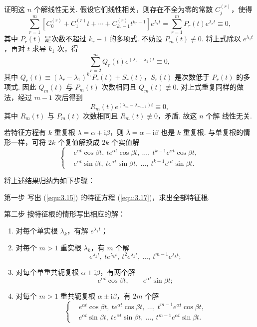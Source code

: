 \begin{pf1}
证明这 $n$ 个解线性无关. 假设它们线性相关，则存在不全为零的常数
$C_j^{(r)}$，使得
\[
\sum_{r=1}^m\left[C_0^{(r)}+C_1^{(r)}t+\cdots
+C_{k_r-1}^{(r)}t^{k_r-1}\right]e^{\lambda_rt}
=\sum_{r=1}^mP_r(t)e^{\lambda_rt}\equiv0,
\]
其中 $P_r(t)$ 是次数不超过 $k_r-1$ 的多项式. 不妨设
$P_m(t)\not\equiv0$. 将上式除以 $e^{\lambda_1t}$，再对 $t$ 求导 $k_1$ 次，得
\[
\sum_{r=2}^mQ_r(t)e^{(\lambda_r-\lambda_1)t}\equiv0,
\]
其中 $Q_r(t)\equiv(\lambda_r-\lambda_1)^{k_1}P_r(t)+S_r(t)$，$S_r(t)$ 是次数低于
$P_r(t)$ 的多项式. 因此 $Q_m(t)$ 与 $P_m(t)$ 次数相同且 $Q_m(t)\not\equiv0$.
对上式重复同样的做法，经过 $m-1$ 次后得到
\[
R_m(t)e^{(\lambda_m-\lambda_{m-1})t}\equiv0,
\]
其中 $R_m(t)$ 与 $P_m(t)$ 次数相同且 $R_m(t)\not\equiv0$，矛盾. 故这 $n$ 个解
线性无关.
\end{pf1}

若特征方程有 $k$ 重复根 $\lambda=\alpha+\mathrm{i}\beta$，则
$\bar\lambda=\alpha-\mathrm{i}\beta$ 也是 $k$ 重复根. 与单复根的情形一样，可将
$2k$ 个复值解换成 $2k$ 个实值解
\[
\left\{
\begin{aligned}
&e^{\alpha t}\cos\beta t,\ te^{\alpha t}\cos\beta t,\ \dots,\
t^{k-1}e^{\alpha t}\cos\beta t,\\
&e^{\alpha t}\sin\beta t,\ te^{\alpha t}\sin\beta t,\ \dots,\
t^{k-1}e^{\alpha t}\sin\beta t.
\end{aligned}
\right.
\]

将上述结果归纳为如下步骤：

第一步 写出 (\ref{equ:3.15}) 的特征方程 (\ref{equ:3.17})，求出全部特征根.

第二步 按特征根的情形写出相应的解：
\begin{enumerate}
\item 对每个单实根 $\lambda_k$，有解 $e^{\lambda_kt}$；
\item 对每个 $m>1$ 重实根 $\lambda_k$，有 $m$ 个解
\[
e^{\lambda_kt},\ te^{\lambda_kt},\ t^2e^{\lambda_kt},\ \dots,\
t^{m-1}e^{\lambda_kt};
\]
\item 对每个单重共轭复根 $\alpha\pm\mathrm{i}\beta$，有两个解
\[
e^{\alpha t}\cos\beta t,\qquad e^{\alpha t}\sin\beta t;
\]
\item 对每个 $m>1$ 重共轭复根 $\alpha\pm\mathrm{i}\beta$，有 $2m$ 个解
\[
\left\{
\begin{aligned}
&e^{\alpha t}\cos\beta t,\ te^{\alpha t}\cos\beta t,\ \dots,\
t^{m-1}e^{\alpha t}\cos\beta t,\\
&e^{\alpha t}\sin\beta t,\ te^{\alpha t}\sin\beta t,\ \dots,\
t^{m-1}e^{\alpha t}\sin\beta t.
\end{aligned}
\right.
\]
\end{enumerate}

